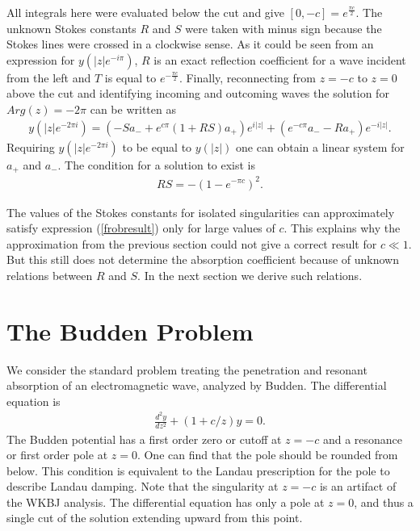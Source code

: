 \documentclass[aip,jmp,reprint]{revtex4-1}
\begin{document}
All integrals here were evaluated below the cut and give $[0,-c]=e^{\frac{\pi c}{2}}$. The unknown Stokes constants $R$ and $S$ were taken with minus sign because the Stokes lines were crossed in a clockwise sense. As it could be seen from an expression for \mbox{$y(|z|e^{-i\pi})$}, $R$ is an exact reflection coefficient for a wave incident from the left and $T$ is equal to $e^{-\frac{\pi c}{2}}$.
Finally, reconnecting from $z=-c$ to $z=0$ above the cut and identifying incoming and outcoming waves the solution for \mbox{$Arg(z)=-2\pi$} can be written as
\begin{eqnarray}
y(|z|e^{-2\pi i})=(-Sa_- +e^{c \pi}(1+RS)a_+)e^{i|z|}+(e^{-c \pi} a_- - R a_+)e^{-i|z|}.   \label{m2pirot}
\end{eqnarray}
Requiring $y(|z|e^{-2\pi i})$ to be equal to $y(|z|)$ one can obtain a linear system for $a_+$ and $a_-$. The condition for a solution to exist is
\begin{eqnarray}
RS=-(1-e^{-\pi c})^2.   \label{frobresult}
\end{eqnarray}

The values of the Stokes constants for isolated singularities can approximately satisfy expression (\ref{frobresult}) only for large values of $c$. This explains why the approximation from the previous section could not give a correct result for \mbox{$c\ll 1$}. But this still does not determine  the absorption coefficient because of unknown relations between $R$ and $S$. In the next section we derive such relations.

\section{The Budden Problem \label{budden}}

We consider the standard problem treating the penetration and resonant absorption of an electromagnetic wave, analyzed by Budden\cite{white-chen,budden}. The differential equation is
\begin{eqnarray}
\frac{d^2y}{dz^2} + (1+c/z)y = 0.  \label{budeq}
\end{eqnarray}
The Budden potential has a first order zero or cutoff  at \mbox{$z=-c$} and a resonance or first order pole at \mbox{$z=0$}. One can find that the pole should be rounded from below. This condition is equivalent to the Landau prescription for the pole to describe Landau
damping. Note that the singularity at \mbox{$z=-c$} is an artifact of the WKBJ
analysis. The differential equation has only a pole at \mbox{$z=0$}, and thus a
single cut of the solution extending upward from this point.
\end{document}
